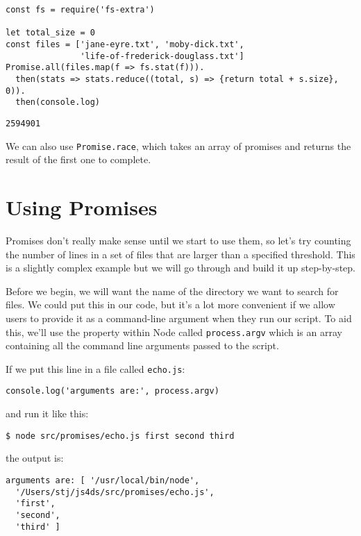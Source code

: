 \begin{verbatim}
const fs = require('fs-extra')

let total_size = 0
const files = ['jane-eyre.txt', 'moby-dick.txt',
               'life-of-frederick-douglass.txt']
Promise.all(files.map(f => fs.stat(f))).
  then(stats => stats.reduce((total, s) => {return total + s.size}, 0)).
  then(console.log)
\end{verbatim}

\begin{verbatim}
2594901
\end{verbatim}

We can also use \texttt{Promise.race},
which takes an array of promises and returns the result of the first one to complete.

\section{Using Promises}\label{s:promises-usage}

Promises don't really make sense until we start to use them,
so let's try counting the number of lines in a set of files
that are larger than a specified threshold.
This is a slightly complex example but we will go through and build it up step-by-step.

Before we begin,
we will want the name of the directory we want to search for files.
We could put this in our code,
but it's a lot more convenient if we allow users to provide it as a command-line argument
when they run our script.
To aid this,
we'll use the property within Node called \texttt{process.argv}
which is an array containing all the command line arguments passed to the script.

If we put this line in a file called \texttt{echo.js}:

\begin{verbatim}
console.log('arguments are:', process.argv)
\end{verbatim}

\noindent
and run it like this:

\begin{verbatim}
$ node src/promises/echo.js first second third
\end{verbatim}

\noindent
the output is:

\begin{verbatim}
arguments are: [ '/usr/local/bin/node',
  '/Users/stj/js4ds/src/promises/echo.js',
  'first',
  'second',
  'third' ]
\end{verbatim}

